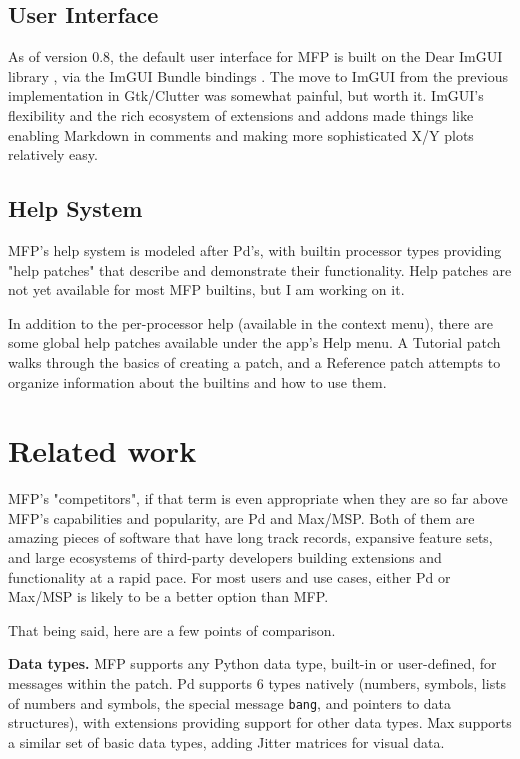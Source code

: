 \documentclass[a4paper]{article}
\begin{document}
\subsection{User Interface}

As of version 0.8, the default user interface for MFP is built on
the Dear ImGUI library \cite{DearImGUI}, via the ImGUI Bundle
bindings \cite{ImguiBundle}. The move to ImGUI from the previous
implementation in Gtk/Clutter was somewhat painful, but worth it.
ImGUI's flexibility and the rich ecosystem of extensions and
addons made things like enabling Markdown in comments and making
more sophisticated X/Y plots relatively easy.

\subsection{Help System}

MFP's help system is modeled after Pd's, with builtin processor
types providing "help patches" that describe and demonstrate
their functionality. Help patches are not yet available for most
MFP builtins, but I am working on it.

In addition to the per-processor help (available in the context menu),
there are some global help patches available under the app's Help menu.
A Tutorial patch walks through the basics of creating a patch, and
a Reference patch attempts to organize information about the
builtins and how to use them.


\section{Related work}

MFP's "competitors", if that term is even appropriate when they
are so far above MFP's capabilities and popularity, are Pd and
Max/MSP. Both of them are amazing pieces of software that have
long track records, expansive feature sets, and large ecosystems
of third-party developers building extensions and functionality
at a rapid pace. For most users and use cases, either Pd or
Max/MSP is likely to be a better option than MFP.

That being said, here are a few points of comparison.

{\bf Data types.} MFP supports any Python data type, built-in or
user-defined, for messages within the patch. Pd supports 6 types
natively (numbers, symbols, lists of numbers and symbols, the
special message {\tt bang}, and pointers to data structures),
with extensions providing support for other data types. Max
supports a similar set of basic data types, adding Jitter
matrices for visual data.
\end{document}
